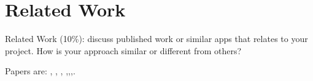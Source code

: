 \section{Related Work}
Related Work (10\%): discuss published work or similar apps that relates to your project. How is your approach similar or different from others?

Papers are: \cite{chromagan}, \cite{su}, \cite{zhang}, \cite{dahl},\cite{animation},\cite{cartoonize},\cite{language}.
